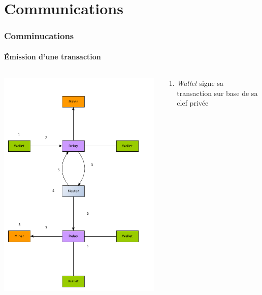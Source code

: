 \documentclass{beamer}
\begin{document}
\section{Communications}
\begin{frame}
	\frametitle{Comminucations}
    \framesubtitle{Émission d'une transaction}
    \begin{columns}
      \begin{column}{.5\textwidth}
      	\begin{center}
      		\includegraphics[scale=0.25]{sendTransaction.png}
      	\end{center}
      \end{column}
      \begin{column}{.5\textwidth}
		\begin{enumerate}
			\item \textit{Wallet} signe sa transaction sur base de sa clef privée

\end{enumerate}
\end{column}
\end{columns}
\end{frame}
\end{document}
